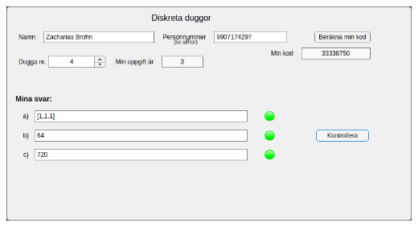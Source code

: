 \documentclass[a4paper,12pt]{article}
\begin{document}
\includegraphics[width=\textwidth]{JQJzlcO.png}
\end{document}
